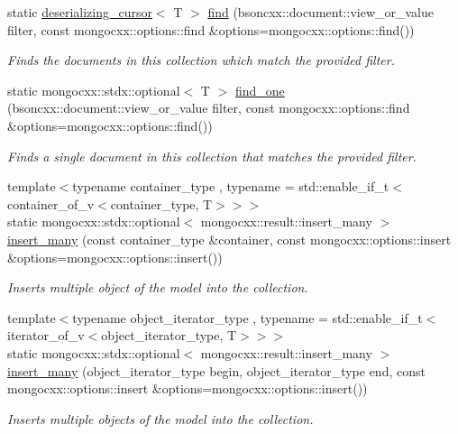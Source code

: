\begin{DoxyCompactItemize}
static \hyperlink{classmangrove_1_1deserializing__cursor}{deserializing\+\_\+cursor}$<$ T $>$ \hyperlink{classmangrove_1_1model_aa0be0e6204d17a62797f3384cbb5a6b1}{find} (bsoncxx\+::document\+::view\+\_\+or\+\_\+value filter, const mongocxx\+::options\+::find \&options=mongocxx\+::options\+::find())
\begin{DoxyCompactList}\small\item\em Finds the documents in this collection which match the provided filter. \end{DoxyCompactList}\item 
static mongocxx\+::stdx\+::optional$<$ T $>$ \hyperlink{classmangrove_1_1model_a36488dcf05af9a7426bdebb40fbbd8d4}{find\+\_\+one} (bsoncxx\+::document\+::view\+\_\+or\+\_\+value filter, const mongocxx\+::options\+::find \&options=mongocxx\+::options\+::find())
\begin{DoxyCompactList}\small\item\em Finds a single document in this collection that matches the provided filter. \end{DoxyCompactList}\item 
{\footnotesize template$<$typename container\+\_\+type , typename  = std\+::enable\+\_\+if\+\_\+t$<$container\+\_\+of\+\_\+v$<$container\+\_\+type, T$>$$>$$>$ }\\static mongocxx\+::stdx\+::optional$<$ mongocxx\+::result\+::insert\+\_\+many $>$ \hyperlink{classmangrove_1_1model_a7250891868c6bab48f1cd741f8164b46}{insert\+\_\+many} (const container\+\_\+type \&container, const mongocxx\+::options\+::insert \&options=mongocxx\+::options\+::insert())
\begin{DoxyCompactList}\small\item\em Inserts multiple object of the model into the collection. \end{DoxyCompactList}\item 
{\footnotesize template$<$typename object\+\_\+iterator\+\_\+type , typename  = std\+::enable\+\_\+if\+\_\+t$<$iterator\+\_\+of\+\_\+v$<$object\+\_\+iterator\+\_\+type, T$>$$>$$>$ }\\static mongocxx\+::stdx\+::optional$<$ mongocxx\+::result\+::insert\+\_\+many $>$ \hyperlink{classmangrove_1_1model_a14db2af5bc4d46898e2a643797bff060}{insert\+\_\+many} (object\+\_\+iterator\+\_\+type begin, object\+\_\+iterator\+\_\+type end, const mongocxx\+::options\+::insert \&options=mongocxx\+::options\+::insert())
\begin{DoxyCompactList}\small\item\em Inserts multiple objects of the model into the collection. \end{DoxyCompactList}\item 

\end{DoxyCompactItemize}
